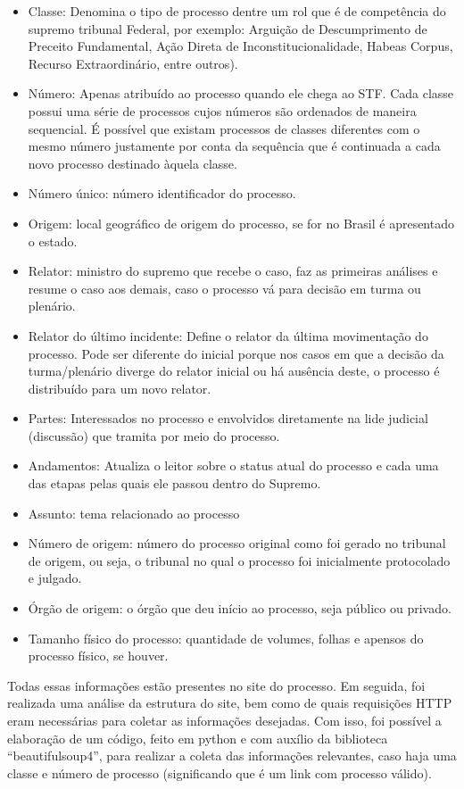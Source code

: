 \begin{itemize}
    \item Classe: Denomina o tipo de processo dentre um rol que é de competência do supremo tribunal Federal, por exemplo: Arguição de Descumprimento de Preceito Fundamental, Ação Direta de Inconstitucionalidade, Habeas Corpus, Recurso Extraordinário, entre outros).
    \item Número: Apenas atribuído ao processo quando ele chega ao STF. Cada classe possui uma série de processos cujos números são ordenados de maneira sequencial. É possível que existam processos de classes diferentes com o mesmo número justamente por conta da sequência que é continuada a cada novo processo destinado àquela classe.
    \item Número único: número identificador do processo.
    \item Origem: local geográfico de origem do processo, se for no Brasil é apresentado o estado.   
    \item Relator: ministro do supremo que recebe o caso, faz as primeiras análises e resume o caso aos demais, caso o processo vá para decisão em turma ou plenário.
    \item Relator do último incidente: Define o relator da última movimentação do processo. Pode ser diferente do inicial porque nos casos em que a decisão da turma/plenário diverge do relator inicial ou há ausência deste, o  processo é distribuído para um novo relator.
    \item Partes: Interessados no processo e envolvidos diretamente na lide judicial (discussão) que tramita por meio do processo. 
    \item Andamentos: Atualiza o leitor sobre o status atual do processo e cada uma das etapas pelas quais ele passou dentro do Supremo. 
    \item Assunto: tema relacionado ao processo
    \item Número de origem: número do processo original como foi gerado no tribunal de origem, ou seja, o tribunal no qual o processo foi inicialmente protocolado e julgado. 
    \item Órgão de origem: o órgão que deu início ao processo, seja público ou privado.
    \item Tamanho físico do processo: quantidade de volumes, folhas e apensos do processo físico, se houver. 
\end{itemize}

Todas essas informações estão presentes no site do processo.
Em seguida, foi realizada uma análise da estrutura do site, bem como de quais requisições HTTP eram necessárias para coletar as informações desejadas. Com isso, foi possível a elaboração de um código, feito em python e com auxílio da biblioteca “beautifulsoup4”, para realizar a coleta das informações relevantes, caso haja uma classe e número de processo (significando que é um link com processo válido). 

